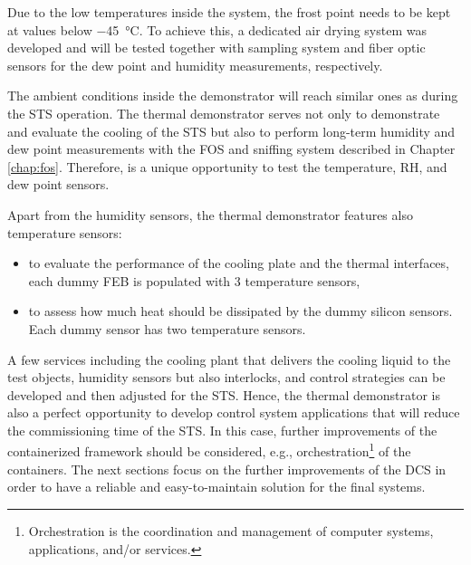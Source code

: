 Due to the low temperatures inside the system, the frost point needs to be kept at values below \SI{-45}{\celsius}. To achieve this, a dedicated air drying system was developed and will be tested together with sampling system and fiber optic sensors for the dew point and humidity measurements, respectively. 
 
 The ambient conditions inside the demonstrator will reach similar ones as during the \gls{STS} operation. The thermal demonstrator serves not only to demonstrate and evaluate the cooling of the \gls{STS} but also to perform long-term humidity and dew point measurements with the \gls{FOS} and sniffing system described in Chapter \ref{chap:fos}. Therefore,  is a unique opportunity to test the temperature, RH, and dew point sensors.
 
 Apart from the humidity sensors, the thermal demonstrator features also temperature sensors:
 \begin{itemize}
     \item to evaluate the performance of the cooling plate and the thermal interfaces, each dummy \gls{FEB} is populated with 3 temperature sensors,
     \item to assess how much heat should be dissipated by the dummy silicon sensors. Each dummy sensor has two temperature sensors.
 \end{itemize}



A few services including the cooling plant that delivers the cooling liquid to the test objects, humidity sensors but also interlocks, and control strategies can be developed and then adjusted for the \gls{STS}. Hence, the thermal demonstrator is also a perfect opportunity to develop control system applications that will reduce the commissioning time of the \gls{STS}. In this case, further improvements of the containerized framework should be considered, e.g., orchestration\footnote{Orchestration is the coordination and management of computer systems, applications, and/or services.} of the containers. The next sections focus on the further improvements of the \gls{DCS} in order to have a reliable and easy-to-maintain solution for the final systems. 